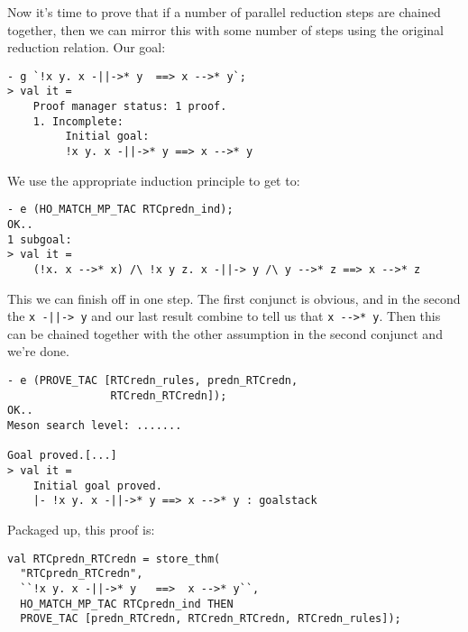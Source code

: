 Now it's time to prove that if a number of parallel reduction steps
are chained together, then we can mirror this with some number of
steps using the original reduction relation.  Our goal:
\begin{session}
\begin{verbatim}
- g `!x y. x -||->* y  ==> x -->* y`;
> val it =
    Proof manager status: 1 proof.
    1. Incomplete:
         Initial goal:
         !x y. x -||->* y ==> x -->* y
\end{verbatim}
\end{session}
We use the appropriate induction principle to get to:
\begin{session}
\begin{verbatim}
- e (HO_MATCH_MP_TAC RTCpredn_ind);
OK..
1 subgoal:
> val it =
    (!x. x -->* x) /\ !x y z. x -||-> y /\ y -->* z ==> x -->* z
\end{verbatim}
\end{session}
This we can finish off in one step.  The first conjunct is obvious,
and in the second the \verb!x -||-> y! and our last result combine to
tell us that \verb!x -->* y!.  Then this can be chained together with
the other assumption in the second conjunct and we're done.
\begin{session}
\begin{verbatim}
- e (PROVE_TAC [RTCredn_rules, predn_RTCredn,
                RTCredn_RTCredn]);
OK..
Meson search level: .......

Goal proved.[...]
> val it =
    Initial goal proved.
    |- !x y. x -||->* y ==> x -->* y : goalstack
\end{verbatim}
\end{session}
Packaged up, this proof is:
\begin{session}
\begin{verbatim}
val RTCpredn_RTCredn = store_thm(
  "RTCpredn_RTCredn",
  ``!x y. x -||->* y   ==>  x -->* y``,
  HO_MATCH_MP_TAC RTCpredn_ind THEN
  PROVE_TAC [predn_RTCredn, RTCredn_RTCredn, RTCredn_rules]);
\end{verbatim}
\end{session}
\eos{}

